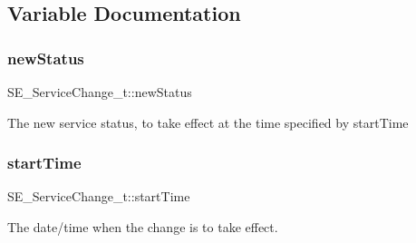 \subsection{Variable Documentation}
\mbox{\label{group__ServiceChange_ga6fc30f7a71370dcc2caad34630b3404e}} 
\subsubsection{\texorpdfstring{new\+Status}{newStatus}}
{\footnotesize\ttfamily S\+E\+\_\+\+Service\+Change\+\_\+t\+::new\+Status}

The new service status, to take effect at the time specified by start\+Time \mbox{\label{group__ServiceChange_gad007f73cce823a5322de7f46935a4bfe}} 
\subsubsection{\texorpdfstring{start\+Time}{startTime}}
{\footnotesize\ttfamily S\+E\+\_\+\+Service\+Change\+\_\+t\+::start\+Time}

The date/time when the change is to take effect. 